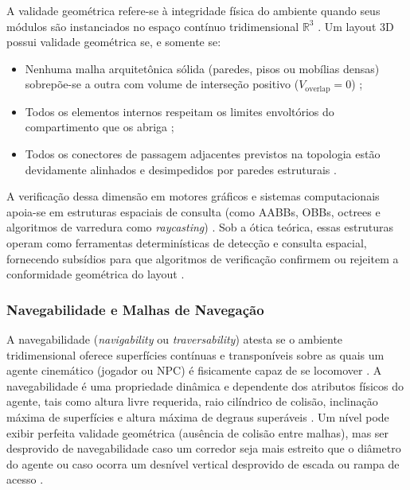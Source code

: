 A validade geométrica refere-se à integridade física do ambiente quando seus módulos são instanciados no espaço contínuo tridimensional $\mathbb{R}^3$ \cite{ericson2004realtime, xu2025constraint, feng2026repurposing3dgenerativemodel}. Um layout 3D possui validade geométrica se, e somente se:
\begin{itemize}
    \item Nenhuma malha arquitetônica sólida (paredes, pisos ou mobílias densas) sobrepõe-se a outra com volume de interseção positivo ($V_{\text{overlap}} = 0$) \cite{ericson2004realtime, xu2025constraint};
    \item Todos os elementos internos respeitam os limites envoltórios do compartimento que os abriga \cite{xu2025constraint};
    \item Todos os conectores de passagem adjacentes previstos na topologia estão devidamente alinhados e desimpedidos por paredes estruturais \cite{linden2013designing, xu2025databasedrivenframework3dlevel}.
\end{itemize}

A verificação dessa dimensão em motores gráficos e sistemas computacionais apoia-se em estruturas espaciais de consulta (como AABBs, OBBs, octrees e algoritmos de varredura como \textit{raycasting}) \cite{shaker2016constructive, ericson2004realtime}. Sob a ótica teórica, essas estruturas operam como ferramentas determinísticas de detecção e consulta espacial, fornecendo subsídios para que algoritmos de verificação confirmem ou rejeitem a conformidade geométrica do layout \cite{shaker2016constructive, xu2025constraint}.

\subsubsection{Navegabilidade e Malhas de Navegação}
\label{sec:navegabilidade}

A navegabilidade (\textit{navigability} ou \textit{traversability}) atesta se o ambiente tridimensional oferece superfícies contínuas e transponíveis sobre as quais um agente cinemático (jogador ou NPC) é fisicamente capaz de se locomover \cite{snook2000simplified, xu2025constraint, xu2025databasedrivenframework3dlevel}. A navegabilidade é uma propriedade dinâmica e dependente dos atributos físicos do agente, tais como altura livre requerida, raio cilíndrico de colisão, inclinação máxima de superfícies e altura máxima de degraus superáveis \cite{snook2000simplified, xu2025constraint}. Um nível pode exibir perfeita validade geométrica (ausência de colisão entre malhas), mas ser desprovido de navegabilidade caso um corredor seja mais estreito que o diâmetro do agente ou caso ocorra um desnível vertical desprovido de escada ou rampa de acesso \cite{xu2025databasedrivenframework3dlevel}.

